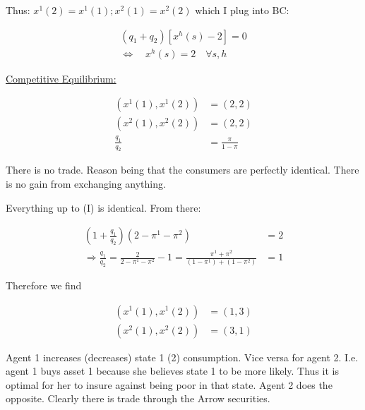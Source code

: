 {\begin{enumerate}[label=(\alph*)]
{Thus: $x^1(2)=x^1(1) ; x^2(1)=x^2(2)$ which I plug into BC:

\begin{align*}
    \left(q_1+q_2\right)\left[x^h(s)-2\right]=0 \\
    \Longleftrightarrow \quad x^h(s)=2 \quad \forall s, h
\end{align*}

\underline{Competitive Equilibrium:}

\begin{align*}
    \left(x^1(1), x^1(2)\right) & =(2,2) \\
    \left(x^2(1), x^2(2)\right) & =(2,2) \\
    \frac{q_1}{q_2} & =\frac{\pi}{1-\pi}
\end{align*}

There is no trade. Reason being that the consumers are perfectly identical. There is no gain from exchanging anything.
}
{\item 
Everything up to (I) is identical. From there:

\begin{align*}
    \left(1+\frac{q_1}{q_2}\right)\left(2-\pi^1-\pi^2\right) & =2 \\
    \Longrightarrow \frac{q_1}{q_2} =\frac{2}{2-\pi^{1}-\pi^2}-1 = \frac{\pi^1+\pi^2}{\left(1-\pi^1\right)+\left(1-\pi^2\right)} &= 1
\end{align*}

Therefore we find

\begin{align*}
    \left(x^1(1), x^1(2)\right) &= (1,3) \\
    \left(x^2(1), x^2(2)\right) &= (3,1)
\end{align*}

Agent 1 increases (decreases) state 1 (2) consumption. Vice versa for agent 2. I.e. agent 1 buys asset 1 because she believes state 1 to be more likely. Thus it is optimal for her to insure against being poor in that state. Agent 2 does the opposite. Clearly there is trade through the Arrow securities.
}
\end{enumerate}
}
